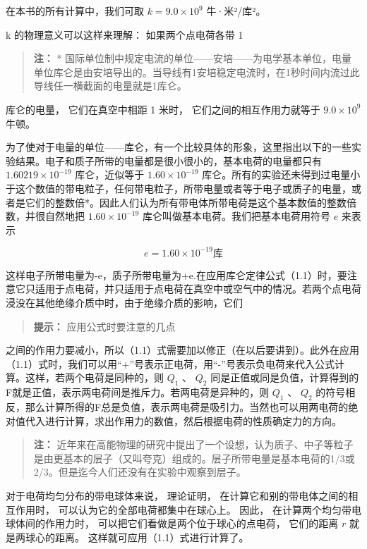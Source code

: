 在本书的所有计算中，我们可取 \(k = 9.0 \times 10^{9}\) 牛·米²/库²。

k 的物理意义可以这样来理解： 如果两个点电荷各带 1

\begin{quote}
\textbf{注：} *
国际单位制中规定电流的单位------安培------为电学基本单位，电量单位库仑是由安培导出的。当导线有1安培稳定电流时，在1秒时间内流过此导线任一横截面的电量就是1库仑。
\end{quote}

库仑的电量， 它们在真空中相距 1 米时， 它们之间的相互作用力就等于
\(9.0 \times 10^{9}\) 牛顿。

为了使对于电量的单位------库仑，有一个比较具体的形象，这里指出以下的一些实验结果。电子和质子所带的电量都是很小很小的，基本电荷的电量都只有
\(1.60219 \times 10^{-19}\) 库仑，近似等于 \(1.60 \times 10^{-19}\)
库仑。所有的实验还未得到过电量小于这个数值的带电粒子，任何带电粒子，所带电量或者等于电子或质子的电量，或者是它们的整数倍*。因此人们认为所有带电体所带电荷是这个基本数值的整数倍数，并很自然地把
\(1.60 \times 10^{-19}\) 库仑叫做基本电荷。我们把基本电荷用符号 \(e\)
来表示

\[
e = 1.60 \times 10^{-19} \text{库}
\]

这样电子所带电量为-e，质子所带电量为+e.在应用库仑定律公式（1.1）时，要注意它只适用于点电荷，并只适用于点电荷在真空中或空气中的情况。若两个点电荷浸没在其他绝缘介质中时，由于绝缘介质的影响，它们

\begin{quote}
\textbf{提示：} 应用公式时要注意的几点
\end{quote}

之间的作用力要减小，所以（1.1）式需要加以修正（在以后要讲到）。此外在应用（1.1）式时，我们可以用``+''号表示正电荷，用``-''号表示负电荷来代入公式计算。这样，若两个电荷是同种的，则
\(Q_{1}\) 、 \(Q_{2}\)
同是正值或同是负值，计算得到的F就是正值，表示两电荷间是推斥力。若两电荷是异种的，则
\(Q_{1}\) 、 \(Q_{2}\)
的符号相反，那么计算所得的F总是负值，表示两电荷是吸引力。当然也可以用两电荷的绝对值代入进行计算，求出作用力的数值，然后根据电荷的性质确定力的方向。

\begin{quote}
\textbf{注：}
近年来在高能物理的研究中提出了一个设想，认为质子、中子等粒子是由更基本的层子（又叫夸克）组成的。层子所带电量是基本电荷的1/3或2/3。但是迄今人们还没有在实验中观察到层子。
\end{quote}

对于电荷均匀分布的带电球体来说， 理论证明，
在计算它和别的带电体之间的相互作用时，
可以认为它的全部电荷都集中在球心上。 因此，
在计算两个均匀带电球体间的作用力时，
可以把它们看做是两个位于球心的点电荷， 它们的距离 \(r\)
就是两球心的距离。 这样就可应用（1.1）式进行计算了。

